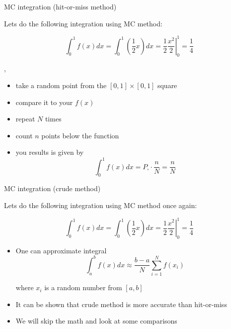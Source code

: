 
\begin{slide}[toc=Hit-or-miss method]{MC integration (hit-or-miss method)}
\null\vfill

  Lets do the following integration using MC method:
  
  $$\int_0^1 f(x)dx = \int_0^1 \left(\frac{1}{2}x\right) dx = \left.\frac{1}{2}\frac{x^2}{2}\right|_{0}^{1} = \frac{1}{4}$$

  \twocolumn
  {
    \sep
    \begin{itemize}
     \item take a random point from the $[0,1]\times[0,1]$ square
     \item compare it to your $f(x)$
     \item repeat $N$ times
     \item count $n$ points below the function
     \item you results is given by
     $$\int_0^1 f(x)dx = P_{\square} \cdot \frac{n}{N} = \frac{n}{N}$$
    \end{itemize}
  }
  {
    
  }
  
\vfill\null
\end{slide}


\begin{slide}[toc=Crude method]{MC integration (crude method)}
\null\vfill

  Lets do the following integration using MC method once again:
  
  $$\int_0^1 f(x)dx = \int_0^1 \left(\frac{1}{2}x\right) dx = \left.\frac{1}{2}\frac{x^2}{2}\right|_{0}^{1} = \frac{1}{4}$$
  \twocolumn
  {
    \begin{itemize}
      \item One can approximate integral
      \vspace{-5pt}
      $$\int_a^b f(x) dx \approx \frac{b - a}{N}\sum_{i=1}^{N} f(x_i)$$
     
      where $x_i$ is a random number from $[a, b]$
      
      \item It can be shown that crude method is more accurate than hit-or-miss
      
      \item We will skip the math and look at some comparisons
      
    \end{itemize}
  }
  {
    
  }

\vfill\null
\end{slide}

